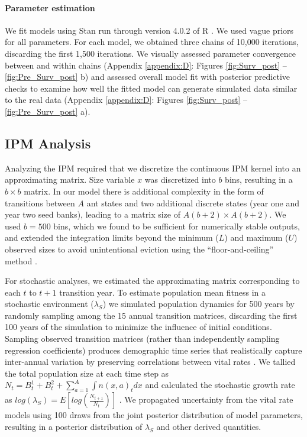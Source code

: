 \documentclass[11pt]{article}
\begin{document}
\paragraph{Parameter estimation}
We fit models using Stan run through version 4.0.2 of R \cite{Rcite,Rstancite}. 
We used vague priors for all parameters. 
For each model, we obtained three chains of 10,000 iterations, discarding the first 1,500 iterations. 
We visually assessed parameter convergence between and within chains (Appendix \ref{appendix:D}: Figures \ref{fig:Surv_post} -- \ref{fig:Pre_Surv_post} b) and assessed overall model fit with posterior predictive checks to examine how well the fitted model can generate simulated data similar to the real data (Appendix \ref{appendix:D}: Figures \ref{fig:Surv_post} -- \ref{fig:Pre_Surv_post} a).

\subsection*{IPM Analysis}
Analyzing the IPM required that we discretize the continuous IPM kernel into an approximating matrix. 
Size variable $x$ was discretized into $b$ bins, resulting in a $b \times b$ matrix.
In our model there is additional complexity in the form of transitions between $A$ ant states and two additional discrete states (year one and year two seed banks), leading to a matrix size of $A(b+2) \times A(b+2)$.
We used $b = 500$ bins, which we found to be sufficient for numerically stable outputs, and extended the integration limits beyond the minimum ($L$) and maximum ($U$) observed sizes to avoid unintentional eviction using the ``floor-and-ceiling'' method \cite{Williams2012}. 

For stochastic analyses, we estimated the approximating matrix corresponding to each $t$ to $t+1$ transition year. 
To estimate population mean fitness in a stochastic environment ($\lambda_{S}$) we simulated population dynamics for 500 years by randomly sampling among the 15 annual transition matrices, discarding the first 100 years of the simulation to minimize the influence of initial conditions. 
Sampling observed transition matrices (rather than independently sampling regression coefficients) produces demographic time series that realistically capture inter-annual variation by preserving correlations between vital rates \cite{metcalf2015statistical}.
We tallied the total population size at each time step as  $N_{t} = B^1_{t} + B^2_{t} + \sum_{a=1}^{A}\int n(x,a)_{t}dx$ and calculated the stochastic growth rate as $log(\lambda_S) = E[log(\frac{N_{t+1}}{N_{t}})]$ \citep{Mark2009}.
We propagated uncertainty from the vital rate models using 100 draws from the joint posterior distribution of model parameters, resulting in a posterior distribution of $\lambda_{S}$ and other derived quantities.
\end{document}
